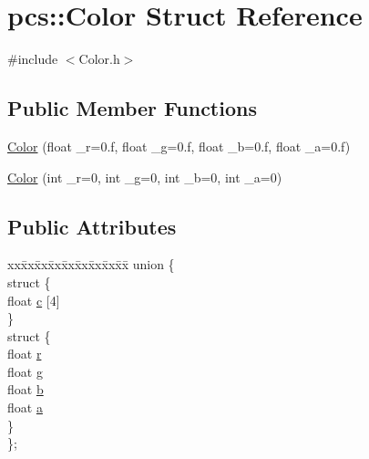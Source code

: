 \hypertarget{structpcs_1_1Color}{}\section{pcs\+:\+:Color Struct Reference}
\label{structpcs_1_1Color}


{\ttfamily \#include $<$Color.\+h$>$}

\subsection*{Public Member Functions}
\begin{DoxyCompactItemize}
\item 
\hyperlink{structpcs_1_1Color_a350f229503770fe243369b423251b9f7}{Color} (float \+\_\+r=0.f, float \+\_\+g=0.f, float \+\_\+b=0.f, float \+\_\+a=0.f)
\item 
\hyperlink{structpcs_1_1Color_af88207521ac6d0abcd33e63e809131ea}{Color} (int \+\_\+r=0, int \+\_\+g=0, int \+\_\+b=0, int \+\_\+a=0)
\end{DoxyCompactItemize}
\subsection*{Public Attributes}
\begin{DoxyCompactItemize}
\item 
\begin{tabbing}
xx\=xx\=xx\=xx\=xx\=xx\=xx\=xx\=xx\=\kill
union \{\\
\>struct \{\\
\>\>float \hyperlink{structpcs_1_1Color_a4c90b67b8a8b61258d890cc29b81b349}{c} \mbox{[}4\mbox{]}\\
\>\} \\
\>struct \{\\
\>\>float \hyperlink{structpcs_1_1Color_a4ce17b9ca9160f68e881db74c3e5d168}{r}\\
\>\>float \hyperlink{structpcs_1_1Color_a647cb2dcb0d538d57e060ccb4c842342}{g}\\
\>\>float \hyperlink{structpcs_1_1Color_a47b93dcb467017c84193c99d52b824e6}{b}\\
\>\>float \hyperlink{structpcs_1_1Color_ae270103e3b2f067eeb6a7e8c2b9a06c0}{a}\\
\>\} \\
\}; \\

\end{tabbing}\end{DoxyCompactItemize}


